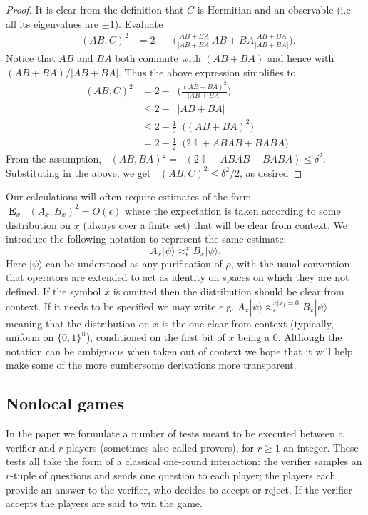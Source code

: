 \documentclass[11pt,letterpaper]{article}
\newcommand{\<}{\langle}
\renewcommand{\>}{\rangle}
\newcommand{\ket}[1]{| #1 \>}
\newcommand{\eps}{\epsilon}
\DeclareMathOperator{\E}{\mathbf{E}}
\DeclareMathOperator{\Id}{\mathbb{I}}
\DeclareMathOperator{\Tr}{Tr}
\DeclareMathOperator{\DIS}{d}
\DeclareMathOperator{\Drho}{\DIS_\rho}
\DeclareMathOperator{\Trho}{\Tr_\rho}
\newcommand{\app}[2]{\approx_{#1}^{#2}}
\begin{document}
\begin{proof}
  It is clear from the definition that $C$ is Hermitian and an
  observable (i.e. all its eigenvalues are $\pm 1$). Evaluate
  \begin{align*}
   \Drho(AB, C)^2 &=  2 - \Trho\Big( \frac{AB + BA}{|AB + BA|} AB + BA \frac{AB
      + BA}{|AB + BA|} \Big).
			\end{align*}
 Notice that $AB$ and $BA$ both commute with $(AB + BA)$ and
  hence with $(AB + BA)/|AB + BA|$. Thus the above
    expression simplifies to
		\begin{align*}
   \Drho(AB,C)^2   &= 2 - \Trho\Big( \frac{(AB + BA)^2}{|AB + BA|} \Big) \\
    &\leq 2 - \Trho|AB + BA| \\
    &\leq 2 - \frac{1}{2} \Trho\big( (AB + BA)^2 \big) \\
    &= 2 - \frac{1}{2} \Trho\big(2 \Id + ABAB + BABA\big). 
  \end{align*}
  From the assumption,  $\Drho(AB,BA)^2 = \Trho(2\Id - ABAB -
  BABA) \leq \delta^2$. Substituting in the above, we get $\Drho(AB,C)^2 \leq \delta^2 / 2$, as desired
\end{proof}

Our calculations will often require estimates of the form $\E_{x} \Drho(
A_x, B_x )^2 = O(\eps)$ where the expectation is taken according to some distribution on $x$ (always over a finite set) that will be clear from context. We introduce the following notation to represent the same estimate: 
$$ A_x\ket{\psi} \app{\eps}{x} B_x\ket{\psi}.$$
Here $\ket{\psi}$ can be understood as any purification of $\rho$, with the usual convention that operators are extended to act as identity on spaces on which they are not defined.  
If the symbol $x$ is omitted then the distribution should be clear from context. If it needs to be specified we may write e.g. $ A_x\ket{\psi} \app{\eps}{x|x_1=0} B_x\ket{\psi}$, meaning that the distribution on $x$ is the one clear from context (typically, uniform on $\{0,1\}^n$), conditioned on the first bit of $x$ being a $0$. Although the notation can be ambiguous when taken out of context we hope that it will help make some of the more cumbersome derivations more transparent. 

\subsection{Nonlocal games}
\label{sec:nonlocal}
In the paper we formulate a number of tests meant to be executed between a verifier and $r$ players (sometimes also called provers), for $r\geq 1$ an integer. These tests all take the form of a classical one-round interaction: the verifier samples an $r$-tuple of questions and sends one question to each player; the players each provide an answer to the verifier, who decides to accept or reject. If the verifier accepts the players are said to win the game. 
\end{document}
